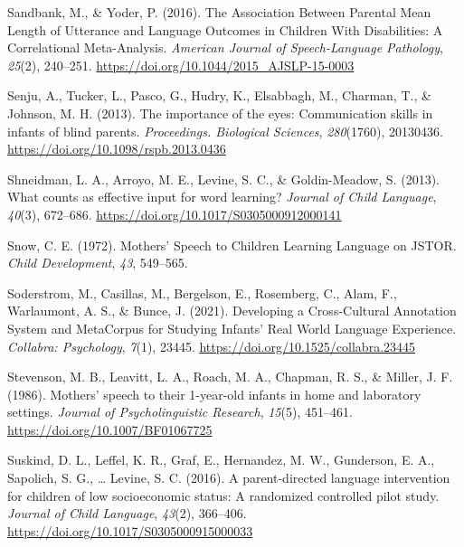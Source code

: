 \documentclass[
  man]{apa6}
\newlength{\cslhangindent}
\newlength{\cslentryspacingunit} %
\newenvironment{CSLReferences}[2] %
 {%
  \setlength{\parindent}{0pt}
  \ifodd #1
  \let\oldpar\par
  \def\par{\hangindent=\cslhangindent\oldpar}
  \fi
  \setlength{\parskip}{#2\cslentryspacingunit}
 }%
 {}
\begin{document}
\begin{CSLReferences}{1}{0}
\leavevmode{}%
Sandbank, M., \& Yoder, P. (2016). The {Association Between Parental Mean Length} of {Utterance} and {Language Outcomes} in {Children With Disabilities}: {A Correlational Meta-Analysis}. \emph{American Journal of Speech-Language Pathology}, \emph{25}(2), 240--251. \url{https://doi.org/10.1044/2015_AJSLP-15-0003}

\leavevmode{}%
Senju, A., Tucker, L., Pasco, G., Hudry, K., Elsabbagh, M., Charman, T., \& Johnson, M. H. (2013). The importance of the eyes: Communication skills in infants of blind parents. \emph{Proceedings. Biological Sciences}, \emph{280}(1760), 20130436. \url{https://doi.org/10.1098/rspb.2013.0436}

\leavevmode{}%
Shneidman, L. A., Arroyo, M. E., Levine, S. C., \& Goldin-Meadow, S. (2013). What counts as effective input for word learning? \emph{Journal of Child Language}, \emph{40}(3), 672--686. \url{https://doi.org/10.1017/S0305000912000141}

\leavevmode{}%
Snow, C. E. (1972). Mothers' {Speech} to {Children Learning Language} on {JSTOR}. \emph{Child Development}, \emph{43}, 549--565.

\leavevmode{}%
Soderstrom, M., Casillas, M., Bergelson, E., Rosemberg, C., Alam, F., Warlaumont, A. S., \& Bunce, J. (2021). Developing a {Cross-Cultural Annotation System} and {MetaCorpus} for {Studying Infants}' {Real World Language Experience}. \emph{Collabra: Psychology}, \emph{7}(1), 23445. \url{https://doi.org/10.1525/collabra.23445}

\leavevmode{}%
Stevenson, M. B., Leavitt, L. A., Roach, M. A., Chapman, R. S., \& Miller, J. F. (1986). Mothers' speech to their 1-year-old infants in home and laboratory settings. \emph{Journal of Psycholinguistic Research}, \emph{15}(5), 451--461. \url{https://doi.org/10.1007/BF01067725}

\leavevmode{}%
Suskind, D. L., Leffel, K. R., Graf, E., Hernandez, M. W., Gunderson, E. A., Sapolich, S. G., \ldots{} Levine, S. C. (2016). A parent-directed language intervention for children of low socioeconomic status: A randomized controlled pilot study. \emph{Journal of Child Language}, \emph{43}(2), 366--406. \url{https://doi.org/10.1017/S0305000915000033}


\end{CSLReferences}
\end{document}
